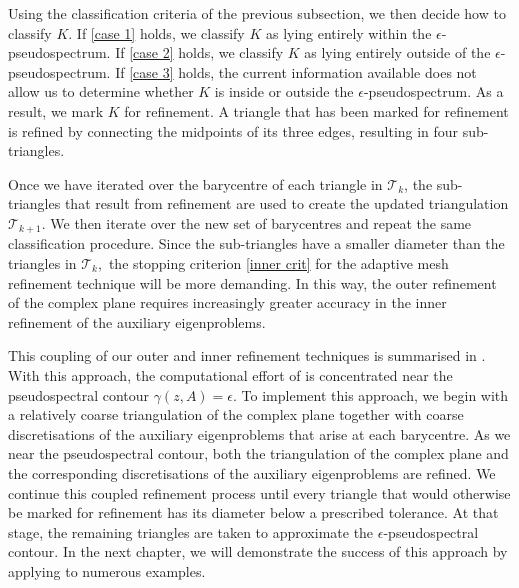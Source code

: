 Using the classification criteria of the previous subsection, we then decide how to classify $K.$ If \eqref{case 1} holds, we classify $K$ as lying entirely within the $\epsilon$-pseudospectrum. If \eqref{case 2} holds, we classify $K$ as lying entirely outside of the $\epsilon$-pseudospectrum. If \eqref{case 3} holds, the current information available does not allow us to determine whether $K$ is inside or outside the $\epsilon$-pseudospectrum. As a result, we mark $K$ for refinement. A triangle that has been marked for refinement is refined by connecting the midpoints of its three edges, resulting in four sub-triangles. 

Once we have iterated over the barycentre of each triangle in $\mathcal{T}_k$, the sub-triangles that result from refinement are used to create the updated triangulation $\mathcal{T}_{k+1}.$ We then iterate over the new set of barycentres and repeat the same classification procedure. Since the sub-triangles have a smaller diameter than the triangles in $\mathcal{T}_k,$ the stopping criterion \eqref{inner crit} for the adaptive mesh refinement technique will be more demanding. In this way, the outer refinement of the complex plane requires increasingly greater accuracy in the inner refinement of the auxiliary eigenproblems. 

This coupling of our outer and inner refinement techniques is summarised in . With this approach, the computational effort of  is concentrated near the pseudospectral contour $\gamma(z, A) = \epsilon.$ To implement this approach, we begin with a relatively coarse triangulation of the complex plane together with coarse discretisations of the auxiliary eigenproblems that arise at each barycentre. As we near the pseudospectral contour, both the triangulation of the complex plane and the corresponding discretisations of the auxiliary eigenproblems are refined. We continue this coupled refinement process until every triangle that would otherwise be marked for refinement has its diameter below a prescribed tolerance. At that stage, the remaining triangles are taken to approximate the $\epsilon$-pseudospectral contour. In the next chapter, we will demonstrate the success of this approach by applying  to numerous examples.




